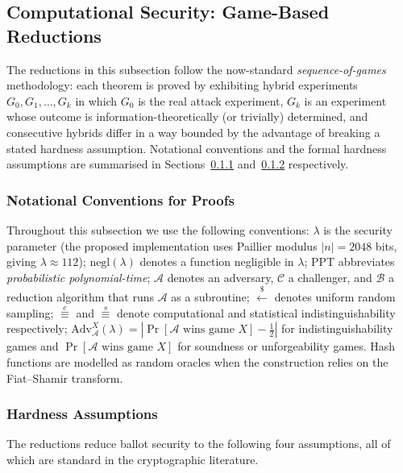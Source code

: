 \subsection{Computational Security: Game-Based Reductions}
\label{subsec:security-theorems}

The reductions in this subsection follow the now-standard \emph{sequence-of-games} methodology: each theorem is proved by exhibiting hybrid experiments $G_0, G_1, \ldots, G_k$ in which $G_0$ is the real attack experiment, $G_k$ is an experiment whose outcome is information-theoretically (or trivially) determined, and consecutive hybrids differ in a way bounded by the advantage of breaking a stated hardness assumption. Notational conventions and the formal hardness assumptions are summarised in Sections~\ref{subsubsec:proof-notation} and~\ref{subsubsec:hardness-assumptions} respectively.

\subsubsection{Notational Conventions for Proofs}
\label{subsubsec:proof-notation}

Throughout this subsection we use the following conventions: $\lambda$ is the security parameter (the proposed implementation uses Paillier modulus $|n| = 2048$ bits, giving $\lambda \approx 112$); $\text{negl}(\lambda)$ denotes a function negligible in $\lambda$; PPT abbreviates \emph{probabilistic polynomial-time}; $\mathcal{A}$ denotes an adversary, $\mathcal{C}$ a challenger, and $\mathcal{B}$ a reduction algorithm that runs $\mathcal{A}$ as a subroutine; $\stackrel{\$}{\leftarrow}$ denotes uniform random sampling; $\stackrel{c}{\equiv}$ and $\stackrel{s}{\equiv}$ denote computational and statistical indistinguishability respectively; $\text{Adv}^{X}_{\mathcal{A}}(\lambda) = |\Pr[\mathcal{A} \text{ wins game } X] - \tfrac{1}{2}|$ for indistinguishability games and $\Pr[\mathcal{A} \text{ wins game } X]$ for soundness or unforgeability games. Hash functions are modelled as random oracles when the construction relies on the Fiat--Shamir transform.

\subsubsection{Hardness Assumptions}
\label{subsubsec:hardness-assumptions}

The reductions reduce ballot security to the following four assumptions, all of which are standard in the cryptographic literature.


